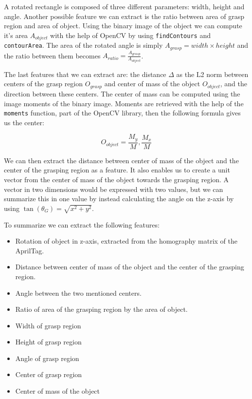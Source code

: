 A rotated rectangle is composed of three different parameters: width, height and angle. Another possible feature we can extract is the ratio between area of grasp region and area of object. Using the binary image of the object we can compute it's area \(A_{object}\) with the help of OpenCV by using \texttt{findContours} and \texttt{contourArea}. The area of the rotated angle is simply \(A_{grasp} = width \times height\) and the ratio between them becomes \(A_{ratio} = \frac{A_{grasp}}{A_{object}} \).

The last features that we can extract are: the distance \(\Delta\) as the L2 norm between centers of the grasp region \(O_{grasp}\) and center of mass of the object \(O_{object}\), and the direction between these centers. The center of mass can be computed using the image moments of the binary image. Moments are retrieved with the help of the \texttt{moments} function, part of the OpenCV library, then the following formula gives us the center:

\[
	O_{object} = \frac{M_y}{M}, \frac{M_x}{M}
\]

We can then extract the distance between center of mass of the object and the center of the grasping region as a feature. It also enables us to create a unit vector from the center of mass of the object towards the grasping region. A vector in two dimensions would be expressed with two values, but we can summarize this in one value by instead calculating the angle on the z-axis by using \(\tan(\theta_G) = \sqrt{x^2 + y^2}\).

To summarize we can extract the following features:
\begin{itemize}
	\item Rotation of object in z-axis, extracted from the homography matrix of the AprilTag.
	\item Distance between center of mass of the object and the center of the grasping region.
	\item Angle between the two mentioned centers.
	\item Ratio of area of the grasping region by the area of object.
	\item Width of grasp region
	\item Height of grasp region
	\item Angle of grasp region
	\item Center of grasp region
	\item Center of mass of the object
\end{itemize}


